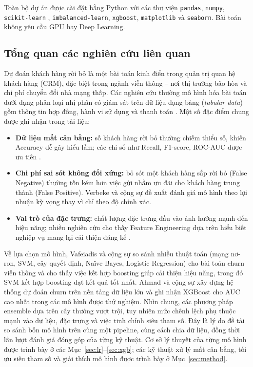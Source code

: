 Toàn bộ dự án được cài đặt bằng Python với các thư viện \texttt{pandas}, \texttt{numpy}, \texttt{scikit-learn} \cite{pedregosa2011}, \texttt{imbalanced-learn}, \texttt{xgboost}, \texttt{matplotlib} và \texttt{seaborn}. Bài toán không yêu cầu GPU hay Deep Learning.

\subsection{Tổng quan các nghiên cứu liên quan}
Dự đoán khách hàng rời bỏ là một bài toán kinh điển trong quản trị quan hệ khách hàng (CRM), đặc biệt trong ngành viễn thông -- nơi thị trường bão hòa và chi phí chuyển đổi nhà mạng thấp. Các nghiên cứu thường mô hình hóa bài toán dưới dạng phân loại nhị phân có giám sát trên dữ liệu dạng bảng (\textit{tabular data}) gồm thông tin hợp đồng, hành vi sử dụng và thanh toán \cite{huang2012, verbeke2012}. Một số đặc điểm chung được ghi nhận trong tài liệu:
\begin{itemize}
    \item \textbf{Dữ liệu mất cân bằng:} số khách hàng rời bỏ thường chiếm thiểu số, khiến Accuracy dễ gây hiểu lầm; các chỉ số như Recall, F1-score, ROC-AUC được ưu tiên \cite{vafeiadis2015}.
    \item \textbf{Chi phí sai sót không đối xứng:} bỏ sót một khách hàng sắp rời bỏ (False Negative) thường tốn kém hơn việc gửi nhầm ưu đãi cho khách hàng trung thành (False Positive). Verbeke và cộng sự \cite{verbeke2012} đề xuất đánh giá mô hình theo lợi nhuận kỳ vọng thay vì chỉ theo độ chính xác.
    \item \textbf{Vai trò của đặc trưng:} chất lượng đặc trưng đầu vào ảnh hưởng mạnh đến hiệu năng; nhiều nghiên cứu cho thấy Feature Engineering dựa trên hiểu biết nghiệp vụ mang lại cải thiện đáng kể \cite{huang2012, ahmad2019}.
\end{itemize}

Về lựa chọn mô hình, Vafeiadis và cộng sự \cite{vafeiadis2015} so sánh nhiều thuật toán (mạng nơ-ron, SVM, cây quyết định, Naïve Bayes, Logistic Regression) cho bài toán churn viễn thông và cho thấy việc kết hợp boosting giúp cải thiện hiệu năng, trong đó SVM kết hợp boosting đạt kết quả tốt nhất. Ahmad và cộng sự \cite{ahmad2019} xây dựng hệ thống dự đoán churn trên nền tảng dữ liệu lớn và ghi nhận XGBoost cho AUC cao nhất trong các mô hình được thử nghiệm. Nhìn chung, các phương pháp ensemble dựa trên cây thường vượt trội, tuy nhiên mức chênh lệch phụ thuộc mạnh vào dữ liệu, đặc trưng và việc tinh chỉnh siêu tham số. Đây là lý do đề tài so sánh bốn mô hình trên cùng một pipeline, cùng cách chia dữ liệu, đồng thời lần lượt đánh giá đóng góp của từng kỹ thuật. Cơ sở lý thuyết của từng mô hình được trình bày ở các Mục~\ref{sec:lr}--\ref{sec:xgb}; các kỹ thuật xử lý mất cân bằng, tối ưu siêu tham số và giải thích mô hình được trình bày ở Mục~\ref{sec:method}.

